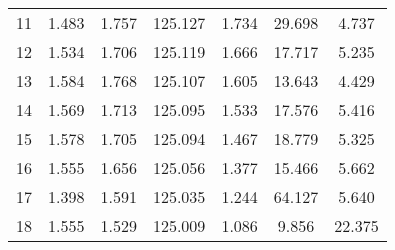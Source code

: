 \begin{table}[h]
\begin{tabular}{l | cccccc}
11  &                     1.483 &                     1.757 &     125.127 &          1.734 &                29.698 &                 4.737 \\
12  &                     1.534 &                     1.706 &     125.119 &          1.666 &                17.717 &                 5.235 \\
13  &                     1.584 &                     1.768 &     125.107 &          1.605 &                13.643 &                 4.429 \\
14  &                     1.569 &                     1.713 &     125.095 &          1.533 &                17.576 &                 5.416 \\
15  &                     1.578 &                     1.705 &     125.094 &          1.467 &                18.779 &                 5.325 \\
16  &                     1.555 &                     1.656 &     125.056 &          1.377 &                15.466 &                 5.662 \\
17  &                     1.398 &                     1.591 &     125.035 &          1.244 &                64.127 &                 5.640 \\
18  &                     1.555 &                     1.529 &     125.009 &          1.086 &                9.856 &                 22.375 \\

\end{tabular}
\end{table}

